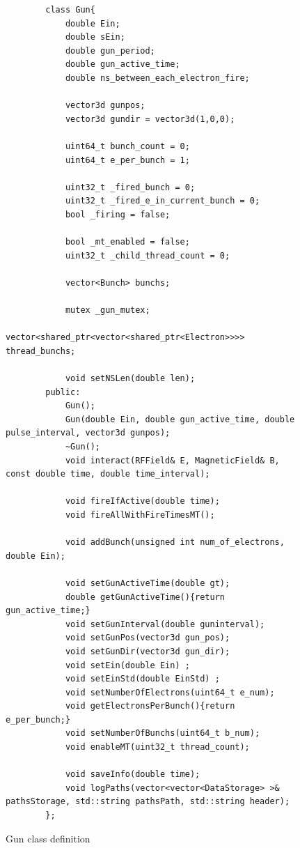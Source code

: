 \documentclass[a4paper,oneside,12pt]{report}
\numberwithin{equation}{chapter}
\begin{document}
\begin{figure}[H]
    \centering
    \captionsetup{justification=centering}
    \begin{verbatim}
        class Gun{
            double Ein;
            double sEin;
            double gun_period;
            double gun_active_time;
            double ns_between_each_electron_fire;

            vector3d gunpos;
            vector3d gundir = vector3d(1,0,0);

            uint64_t bunch_count = 0;
            uint64_t e_per_bunch = 1;

            uint32_t _fired_bunch = 0;
            uint32_t _fired_e_in_current_bunch = 0;
            bool _firing = false;

            bool _mt_enabled = false;
            uint32_t _child_thread_count = 0;

            vector<Bunch> bunchs;

            mutex _gun_mutex; 
            vector<shared_ptr<vector<shared_ptr<Electron>>>> thread_bunchs;

            void setNSLen(double len);
        public:
            Gun();
            Gun(double Ein, double gun_active_time, double pulse_interval, vector3d gunpos);
            ~Gun();
            void interact(RFField& E, MagneticField& B, const double time, double time_interval);

            void fireIfActive(double time);
            void fireAllWithFireTimesMT();
            
            void addBunch(unsigned int num_of_electrons, double Ein);

            void setGunActiveTime(double gt);
            double getGunActiveTime(){return gun_active_time;}
            void setGunInterval(double guninterval);
            void setGunPos(vector3d gun_pos);
            void setGunDir(vector3d gun_dir);
            void setEin(double Ein) ;
            void setEinStd(double EinStd) ;
            void setNumberOfElectrons(uint64_t e_num);
            void getElectronsPerBunch(){return e_per_bunch;}
            void setNumberOfBunchs(uint64_t b_num);
            void enableMT(uint32_t thread_count);
            
            void saveInfo(double time);
            void logPaths(vector<vector<DataStorage> >& pathsStorage, std::string pathsPath, std::string header);
        };
    \end{verbatim}
    \caption{Gun class definition}
    \label{fig:gun_class}
\end{figure}
\end{document}
